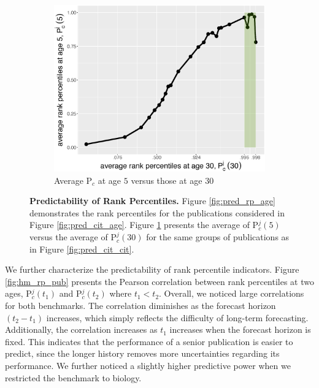 \begin{figure}[ht!]
\begin{subfigure}[b]{0.495\textwidth}
     \includegraphics[width=\textwidth]{figures/pred_power/rp_rp.eps}
     \caption{Average P$_c$ at age $5$ versus those at age $30$}
     \label{fig:pred_rp_rp}
    \end{subfigure}
    \caption{{\bf Predictability of Rank Percentiles.}
    Figure \ref{fig:pred_rp_age} demonstrates the rank percentiles for the publications considered in Figure \ref{fig:pred_cit_age}. Figure \ref{fig:pred_rp_rp} presents the average of P$^j_c(5)$ versus the average of P$^j_c(30)$ for the same groups of publications as in Figure \ref{fig:pred_cit_cit}.}
    \label{fig:pub_rp_pred}
\end{figure}

We further characterize the predictability of rank percentile indicators. Figure \ref{fig:hm_rp_pub} presents the Pearson correlation between rank percentiles at two ages, P$_c^{j}(t_1)$ and P$_c^{j}(t_2)$ where $t_1<t_2$. Overall, we noticed large correlations for both benchmarks. The correlation diminishes as the forecast horizon $(t_2-t_1)$ increases, which simply reflects the difficulty of long-term forecasting. Additionally, the correlation increases as $t_1$ increases when the forecast horizon is fixed. This indicates that the performance of a senior publication is easier to predict, since the longer history removes more uncertainties regarding its performance. We further noticed a slightly higher predictive power when we restricted the benchmark to biology. 

